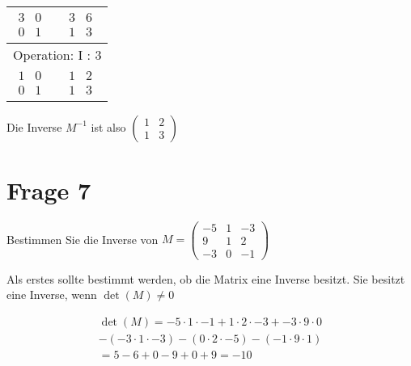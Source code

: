 \begin{longtable}{p{4cm}|p{3cm}}
    $\displaystyle\begin{matrix}
                          3 & 0 \\
                          0 & 1
                      \end{matrix}$         &
    $\displaystyle\begin{matrix}
                          3 & 6 \\
                          1 & 3
                      \end{matrix}$                                                            \\\hline

    \multicolumn{2}{p{\dimexpr4cm+3cm+2\tabcolsep\relax}}{Operation: I : 3}                \\\hline\pagebreak[0]

    $\displaystyle\begin{matrix}
                          1 & 0 \\
                          0 & 1
                      \end{matrix}$         &
    $\displaystyle\begin{matrix}
                          1 & 2 \\
                          1 & 3
                      \end{matrix}$                                                            \\\hline
\end{longtable}

Die Inverse $M^{-1}$ ist also $\begin{pmatrix}
        1 & 2 \\ 1 & 3
    \end{pmatrix}$

\section{Frage 7}

Bestimmen Sie die Inverse von $M = \begin{pmatrix}
        -5 & 1 & -3 \\
        9  & 1 & 2  \\
        -3 & 0 & -1
    \end{pmatrix}$

Als erstes sollte bestimmt werden, ob die Matrix eine Inverse besitzt. Sie
besitzt eine Inverse, wenn $\det(M) \neq 0$

\begin{align*}
    \det(M) = -5 \cdot 1 \cdot -1 + 1 \cdot 2 \cdot -3 + -3 \cdot 9 \cdot 0 \\
    - (-3 \cdot 1 \cdot -3) - (0 \cdot 2 \cdot -5) - (-1 \cdot 9 \cdot 1)   \\
    = 5 - 6 +0 - 9 + 0 + 9 = -10
\end{align*}

